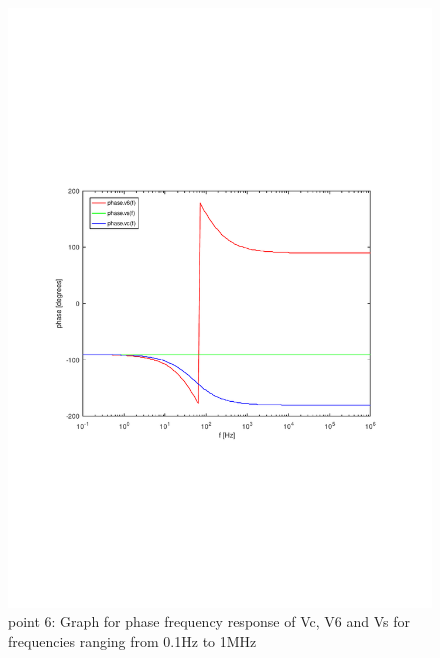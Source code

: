 \begin{figure}[H] \centering
\includegraphics[width=0.9\linewidth]{angle_tab.pdf}
\caption{point 6: Graph for phase frequency response of Vc, V6 and Vs for frequencies ranging from 0.1Hz to 1MHz}
\label{fig:angle_resp}
\end{figure}

\pagebreak


